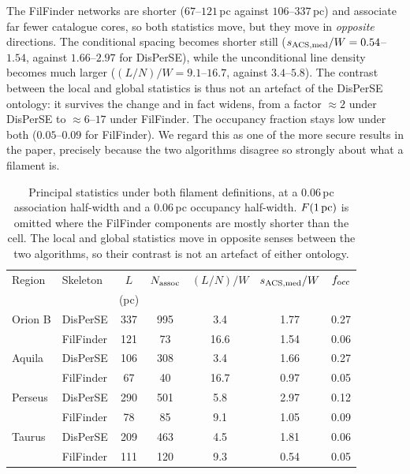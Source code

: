 \documentclass[usenatbib,twoside,twocolumn]{mnras}
\begin{document}
The FilFinder networks are shorter ($67$--$121$\,pc against $106$--$337$\,pc) and associate far fewer catalogue cores, so both statistics move, but they move in \emph{opposite} directions. The conditional spacing becomes shorter still ($s_{\rm ACS,med}/W=0.54$--$1.54$, against $1.66$--$2.97$ for DisPerSE), while the unconditional line density becomes much larger ($(L/N)/W=9.1$--$16.7$, against $3.4$--$5.8$). The contrast between the local and global statistics is thus not an artefact of the DisPerSE ontology: it survives the change and in fact widens, from a factor $\approx2$ under DisPerSE to $\approx6$--$17$ under FilFinder. The occupancy fraction stays low under both ($0.05$--$0.09$ for FilFinder). We regard this as one of the more secure results in the paper, precisely because the two algorithms disagree so strongly about what a filament is.

\begin{table}
\caption{Principal statistics under both filament definitions, at a $0.06$\,pc association half-width and a $0.06$\,pc occupancy half-width. $F(1\,{\rm pc})$ is omitted where the FilFinder components are mostly shorter than the cell. The local and global statistics move in opposite senses between the two algorithms, so their contrast is not an artefact of either ontology.}
\label{tab:ontology}
\footnotesize
\setlength{\tabcolsep}{3pt}
\begin{tabular}{llccccc}
\toprule
Region & Skeleton & $L$ & $N_{\rm assoc}$ & $(L/N)/W$ & $s_{\rm ACS,med}/W$ & $f_{\rm occ}$ \\
 & & (pc) & & & & \\
\midrule
Orion B & DisPerSE  & 337 & 995 & 3.4 & 1.77 & 0.27 \\
        & FilFinder & 121 &  73 & 16.6 & 1.54 & 0.06 \\
Aquila  & DisPerSE  & 106 & 308 & 3.4 & 1.66 & 0.27 \\
        & FilFinder &  67 &  40 & 16.7 & 0.97 & 0.05 \\
Perseus & DisPerSE  & 290 & 501 & 5.8 & 2.97 & 0.12 \\
        & FilFinder &  78 &  85 &  9.1 & 1.05 & 0.09 \\
Taurus  & DisPerSE  & 209 & 463 & 4.5 & 1.81 & 0.06 \\
        & FilFinder & 111 & 120 &  9.3 & 0.54 & 0.05 \\
\bottomrule
\end{tabular}
\end{table}
\end{document}

